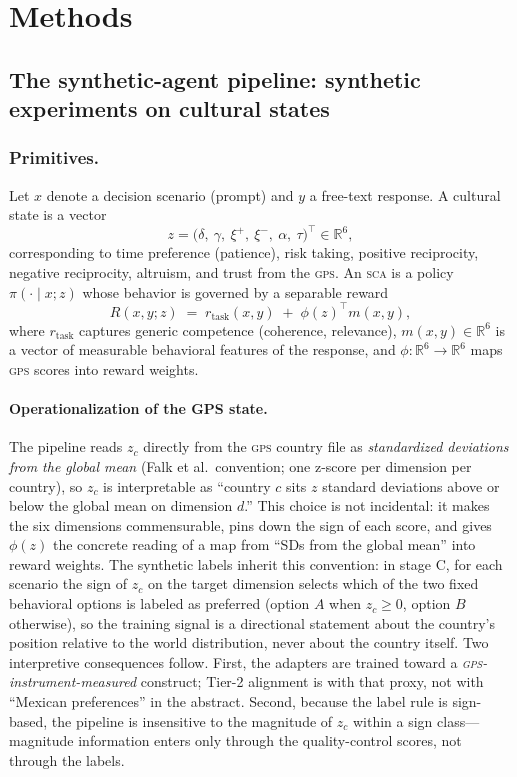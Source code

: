 \documentclass[11pt,letterpaper]{article}
\newcommand{\GPS}{\textsc{gps}}
\newcommand{\SCA}{\textsc{sca}}
\begin{document}
\section{Methods}

\subsection{The synthetic-agent pipeline: synthetic experiments on cultural states}

\subsubsection{Primitives.}
Let $x$ denote a decision scenario (prompt) and $y$ a free-text response. A cultural state is a vector
\begin{equation}
  z = \bigl(\delta,\ \gamma,\ \xi^{+},\ \xi^{-},\ \alpha,\ \tau\bigr)^{\!\top} \in \mathbb{R}^{6},
\end{equation}
corresponding to time preference (patience), risk taking, positive reciprocity, negative reciprocity, altruism, and trust from the \GPS{}. An \SCA{} is a policy $\pi(\cdot\mid x; z)$ whose behavior is governed by a separable reward
\begin{equation}
  R(x,y;z) \;=\; r_{\mathrm{task}}(x,y) \;+\; \phi(z)^{\!\top} m(x,y),
  \label{eq:reward}
\end{equation}
where $r_{\mathrm{task}}$ captures generic competence (coherence, relevance), $m(x,y)\in\mathbb{R}^{6}$ is a vector of measurable behavioral features of the response, and $\phi:\mathbb{R}^{6}\to\mathbb{R}^{6}$ maps \GPS{} scores into reward weights.

\paragraph{Operationalization of the GPS state.}
The pipeline reads $z_c$ directly from the \GPS{} country file as \emph{standardized deviations from the global mean} (Falk et al.\ convention; one z-score per dimension per country), so $z_c$ is interpretable as ``country $c$ sits $z$ standard deviations above or below the global mean on dimension $d$.'' This choice is not incidental: it makes the six dimensions commensurable, pins down the sign of each score, and gives $\phi(z)$ the concrete reading of a map from ``SDs from the global mean'' into reward weights. The synthetic labels inherit this convention: in stage C, for each scenario the sign of $z_c$ on the target dimension selects which of the two fixed behavioral options is labeled as preferred (option $A$ when $z_c \ge 0$, option $B$ otherwise), so the training signal is a directional statement about the country's position relative to the world distribution, never about the country itself. Two interpretive consequences follow. First, the adapters are trained toward a \emph{\GPS{}-instrument-measured} construct; Tier-2 alignment is with that proxy, not with ``Mexican preferences'' in the abstract. Second, because the label rule is sign-based, the pipeline is insensitive to the magnitude of $z_c$ within a sign class---magnitude information enters only through the quality-control scores, not through the labels.
\end{document}
